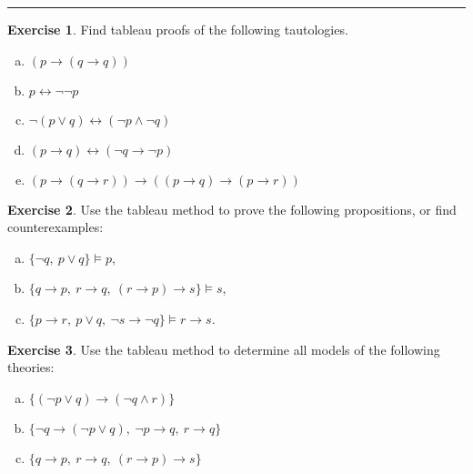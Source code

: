 \documentclass{amsart}
\theoremstyle{definition}
\newtheorem{problem}{Exercise}
\begin{document}
\hrule
\vspace{-1cm}
\begin{multicols}{2}
\begin{problem}
Find tableau proofs of the following tautologies.

\begin{enumerate}[(a)]
\item $(p\to (q \to q))$
\item $p \leftrightarrow \neg \neg  p$
\item $\neg (p \vee q) \leftrightarrow (\neg p \wedge \neg q)$
\item $(p \to q) \leftrightarrow (\neg q \to \neg p)$
\item $(p \to (q \to r)) \to ((p\to q)\to (p \to r))$
\end{enumerate}

\end{problem} 

\begin{problem}
Use the tableau method to prove the following propositions, or find counterexamples:
\begin{enumerate}[(a)]
\item $\{ \neg q,\ p \vee q\} \models p$,
\item $\{ q \to p,\ r \to q,\ (r \to p) \to s\} \models s$,
\item $\{ p \to r,\ p \vee q,\ \neg s \to \neg q\} \models r \to s$.
\end{enumerate}
\end{problem}

\begin{problem}
Use the tableau method to determine all models of the following theories:
\begin{enumerate}[(a)]
\item $\{(\neg p \vee q) \to (\neg q \wedge r)\}$
\item $\{\neg q \to (\neg p \vee q),\ \neg p \to q,\ r \to q\}$
\item $\{ q \to p,\ r \to q,\ (r \to p) \to s\}$
\end{enumerate}
\end{problem}
\end{multicols}
\end{document}
